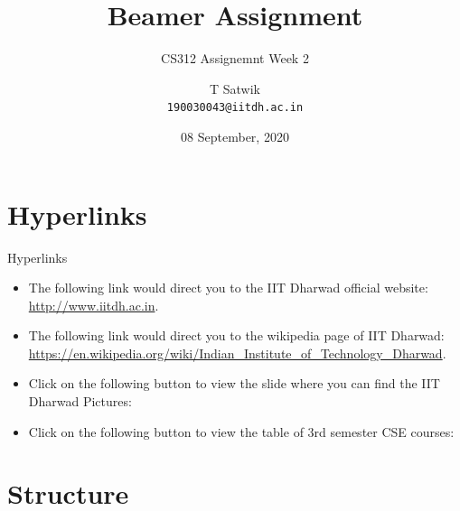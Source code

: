 \documentclass{beamer}
\title{Beamer Assignment}
\subtitle{CS312 Assignemnt Week 2}
\author[T Satwik]{T Satwik \\ \texttt{190030043@iitdh.ac.in}}
\institute[CSE]{Computer Science \& Engineering, IIT Dharwad}           \date{08 September, 2020}
\begin{document}
\frame{\titlepage}



\section{Hyperlinks}  %
\begin{frame}[label=Hyperlinks]{Hyperlinks}
\transdissolve    %

\begin{itemize}[<+->] 
    \item The following link would direct you to the IIT Dharwad official website: \url{http://www.iitdh.ac.in}.
    \item The following link would direct you to the wikipedia page of IIT Dharwad: \url{https://en.wikipedia.org/wiki/Indian_Institute_of_Technology_Dharwad}.
    \item Click on the following button to view the slide where you can find the IIT Dharwad Pictures: \hyperlink{Figures}{}
    \item Click on the following button to view the table of 3rd semester CSE courses: \hyperlink{Table1}{}
    
\end{itemize}
\end{frame}



\section{Structure}  %
\end{document}
